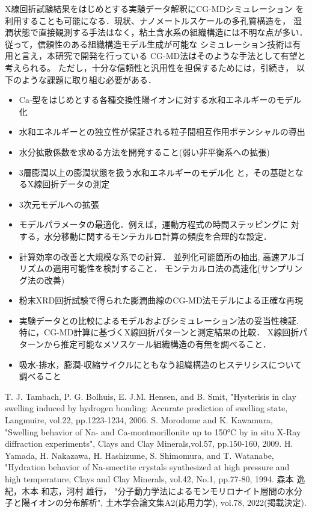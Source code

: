 ﻿\documentclass[11pt,a4j]{jarticle}
\begin{document}
X線回折試験結果をはじめとする実験データ解釈にCG-MDシミュレーション
を利用することも可能になる．現状、ナノメートルスケールの多孔質構造を，
湿潤状態で直接観測する手法はなく，粘土含水系の組織構造には不明な点が多い．
従って，信頼性のある組織構造モデル生成が可能な
シミュレーション技術は有用と言え，本研究で開発を行っている
CG-MD法はそのような手法として有望と考えられる。
ただし，十分な信頼性と汎用性を担保するためには，引続き，
以下のような課題に取り組む必要がある．
\begin{itemize}
\item
	Ca-型をはじめとする各種交換性陽イオンに対する水和エネルギーのモデル化
\item
	水和エネルギーとの独立性が保証される粒子間相互作用ポテンシャルの導出
\item
	水分拡散係数を求める方法を開発すること(弱い非平衡系への拡張)
\item
    	3層膨潤以上の膨潤状態を扱う水和エネルギーのモデル化
	と，その基礎となるX線回折データの測定
\item
	3次元モデルへの拡張
\item
	モデルパラメータの最適化．例えば，運動方程式の時間ステッピングに
	対する，水分移動に関するモンテカルロ計算の頻度を合理的な設定．
\item
	計算効率の改善と大規模な系での計算．
	並列化可能箇所の抽出, 高速アルゴリズムの適用可能性を検討すること．
	モンテカルロ法の高速化(サンプリング法の改善)
\item
	粉末XRD回折試験で得られた膨潤曲線のCG-MD法モデルによる正確な再現
\item
	実験データとの比較によるモデルおよびシミュレーション法の妥当性検証. 
	特に，CG-MD計算に基づくX線回折パターンと測定結果の比較．
	X線回折パターンから推定可能なメソスケール組織構造の有無を調べること．
\item
	吸水-排水，膨潤-収縮サイクルにともなう組織構造のヒステリシスについて調べること
\end{itemize}
\begin{thebibliography}{99}
	T. J. Tambach, P. G. Bolhuis, E. J.M. Hensen, and B. Smit, 
	"Hysterisis in clay swelling induced by hydrogen bonding: 
		Accurate prediction of swelling state, Langmuire, 
	vol.22, pp.1223-1234, 2006.
	S. Morodome and K. Kawamura, 
	"Swelling behavior of Na- and Ca-montmorillonite up to 150°C by 
	in situ X-Ray diffraction experiments", 
	Clays and Clay Minerals,vol.57, pp.150-160, 2009.
	H. Yamada, H. Nakazawa, H. Hashizume, S. Shimomura, and T. Watanabe, 
	"Hydration behavior of Na-smectite crystals synthesized at high pressure 
	and high temperature, Clays and Clay Minerals, vol.42, No.1, pp.77-80, 1994.
	森本 逸紀，木本 和志，河村 雄行，
	"分子動力学法によるモンモリロナイト層間の水分子と陽イオンの分布解析", 
		土木学会論文集A2(応用力学), vol.78, 2022(掲載決定). 	
\end{thebibliography}
\end{document}
